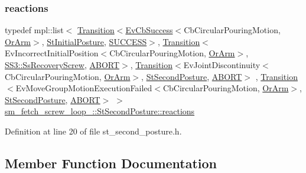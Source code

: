 \subsubsection{\texorpdfstring{reactions}{reactions}}
{\footnotesize\ttfamily typedef mpl\+::list$<$ \hyperlink{classsmacc_1_1Transition}{Transition}$<$\hyperlink{structsmacc_1_1EvCbSuccess}{Ev\+Cb\+Success}$<$Cb\+Circular\+Pouring\+Motion, \hyperlink{classsm__fetch__screw__loop__1_1_1OrArm}{Or\+Arm}$>$, \hyperlink{structsm__fetch__screw__loop__1_1_1StInitialPosture}{St\+Initial\+Posture}, \hyperlink{structsmacc_1_1default__transition__tags_1_1SUCCESS}{S\+U\+C\+C\+E\+SS}$>$, \hyperlink{classsmacc_1_1Transition}{Transition}$<$Ev\+Incorrect\+Initial\+Position$<$Cb\+Circular\+Pouring\+Motion, \hyperlink{classsm__fetch__screw__loop__1_1_1OrArm}{Or\+Arm}$>$, \hyperlink{structsm__fetch__screw__loop__1_1_1SS3_1_1SsRecoveryScrew}{S\+S3\+::\+Ss\+Recovery\+Screw}, \hyperlink{structsmacc_1_1default__transition__tags_1_1ABORT}{A\+B\+O\+RT}$>$, \hyperlink{classsmacc_1_1Transition}{Transition}$<$Ev\+Joint\+Discontinuity$<$Cb\+Circular\+Pouring\+Motion, \hyperlink{classsm__fetch__screw__loop__1_1_1OrArm}{Or\+Arm}$>$, \hyperlink{structsm__fetch__screw__loop__1_1_1StSecondPosture}{St\+Second\+Posture}, \hyperlink{structsmacc_1_1default__transition__tags_1_1ABORT}{A\+B\+O\+RT}$>$ , \hyperlink{classsmacc_1_1Transition}{Transition}$<$Ev\+Move\+Group\+Motion\+Execution\+Failed$<$Cb\+Circular\+Pouring\+Motion, \hyperlink{classsm__fetch__screw__loop__1_1_1OrArm}{Or\+Arm}$>$, \hyperlink{structsm__fetch__screw__loop__1_1_1StSecondPosture}{St\+Second\+Posture}, \hyperlink{structsmacc_1_1default__transition__tags_1_1ABORT}{A\+B\+O\+RT}$>$ $>$ \hyperlink{structsm__fetch__screw__loop__1_1_1StSecondPosture_a9fe38ed5563e5f49b11f4a16f4ca2042}{sm\+\_\+fetch\+\_\+screw\+\_\+loop\+\_\+::\+St\+Second\+Posture\+::reactions}}



Definition at line 20 of file st\+\_\+second\+\_\+posture.\+h.



\subsection{Member Function Documentation}
\mbox{\label{structsm__fetch__screw__loop__1_1_1StSecondPosture_aab9d3da0e164bee4b305ba7bfc047ad0}} 

